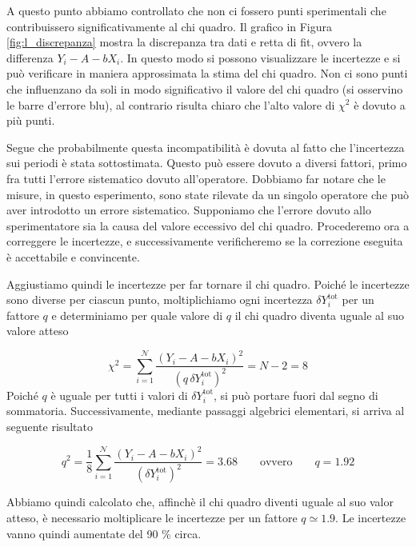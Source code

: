 A questo punto abbiamo controllato che non ci fossero punti sperimentali che contribuissero significativamente
al chi quadro. Il grafico in Figura \ref{fig:l_discrepanza} mostra la discrepanza tra dati e retta di fit,
ovvero la differenza $Y_i - A - bX_i$. In questo modo si possono visualizzare le incertezze e si può verificare
in maniera approssimata la stima del chi quadro. Non ci sono punti che influenzano da soli in modo significativo
il valore del chi quadro (si osservino le barre d'errore blu), al contrario risulta chiaro che l'alto valore di $\chi^2$
è dovuto a più punti.

Segue che probabilmente questa incompatibilità è dovuta al fatto che l'incertezza sui periodi è stata sottostimata.
Questo può essere dovuto a diversi fattori, primo fra tutti l'errore sistematico dovuto all'operatore. Dobbiamo
far notare che le misure, in questo esperimento, sono state rilevate da un singolo operatore che può aver introdotto
un errore sistematico. Supponiamo che
l'errore dovuto allo sperimentatore sia la causa del valore eccessivo del chi quadro. Procederemo ora a correggere le incertezze,
e successivamente verificheremo se la correzione eseguita è accettabile e convincente.

Aggiustiamo quindi le incertezze per far tornare il chi quadro.  Poiché le incertezze sono diverse per ciascun punto,
moltiplichiamo ogni incertezza $\delta Y_i^{\text{tot}}$ per un fattore $q$ e determiniamo per quale valore di $q$
il chi quadro diventa uguale al suo valore atteso

\begin{equation}
    \chi^2 = \sum_{i=1}^\mathcal{N} \frac{(Y_i - A - bX_i)^2}{(q\, \delta Y_i^{\text{tot}})^2} = N - 2 = 8
\end{equation}
%
Poiché $q$ è uguale per tutti i valori di $\delta Y_i^{\text{tot}}$, si può portare fuori dal segno di sommatoria.
Successivamente, mediante passaggi algebrici elementari, si arriva al seguente risultato

\begin{equation}
    q^2 = \frac{1}{8} \sum_{i=1}^\mathcal{N} \frac{(Y_i - A - bX_i)^2}{(\delta Y_i^{\text{tot}})^2} = 3.68 \qquad \text{ovvero} \qquad q = 1.92
\end{equation}

Abbiamo quindi calcolato che, affinchè il chi quadro diventi uguale al suo valor atteso, è necessario moltiplicare
le incertezze per un fattore $q \simeq 1.9$. Le incertezze vanno quindi aumentate del 90 \% circa.

